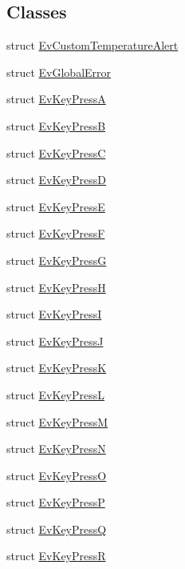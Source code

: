 \subsection*{Classes}
\begin{DoxyCompactItemize}
\item 
struct \hyperlink{structsm__dance__bot_1_1EvCustomTemperatureAlert}{Ev\+Custom\+Temperature\+Alert}
\item 
struct \hyperlink{structsm__dance__bot_1_1EvGlobalError}{Ev\+Global\+Error}
\item 
struct \hyperlink{structsm__dance__bot_1_1EvKeyPressA}{Ev\+Key\+PressA}
\item 
struct \hyperlink{structsm__dance__bot_1_1EvKeyPressB}{Ev\+Key\+PressB}
\item 
struct \hyperlink{structsm__dance__bot_1_1EvKeyPressC}{Ev\+Key\+PressC}
\item 
struct \hyperlink{structsm__dance__bot_1_1EvKeyPressD}{Ev\+Key\+PressD}
\item 
struct \hyperlink{structsm__dance__bot_1_1EvKeyPressE}{Ev\+Key\+PressE}
\item 
struct \hyperlink{structsm__dance__bot_1_1EvKeyPressF}{Ev\+Key\+PressF}
\item 
struct \hyperlink{structsm__dance__bot_1_1EvKeyPressG}{Ev\+Key\+PressG}
\item 
struct \hyperlink{structsm__dance__bot_1_1EvKeyPressH}{Ev\+Key\+PressH}
\item 
struct \hyperlink{structsm__dance__bot_1_1EvKeyPressI}{Ev\+Key\+PressI}
\item 
struct \hyperlink{structsm__dance__bot_1_1EvKeyPressJ}{Ev\+Key\+PressJ}
\item 
struct \hyperlink{structsm__dance__bot_1_1EvKeyPressK}{Ev\+Key\+PressK}
\item 
struct \hyperlink{structsm__dance__bot_1_1EvKeyPressL}{Ev\+Key\+PressL}
\item 
struct \hyperlink{structsm__dance__bot_1_1EvKeyPressM}{Ev\+Key\+PressM}
\item 
struct \hyperlink{structsm__dance__bot_1_1EvKeyPressN}{Ev\+Key\+PressN}
\item 
struct \hyperlink{structsm__dance__bot_1_1EvKeyPressO}{Ev\+Key\+PressO}
\item 
struct \hyperlink{structsm__dance__bot_1_1EvKeyPressP}{Ev\+Key\+PressP}
\item 
struct \hyperlink{structsm__dance__bot_1_1EvKeyPressQ}{Ev\+Key\+PressQ}
\item 
struct \hyperlink{structsm__dance__bot_1_1EvKeyPressR}{Ev\+Key\+PressR}

\end{DoxyCompactItemize}
